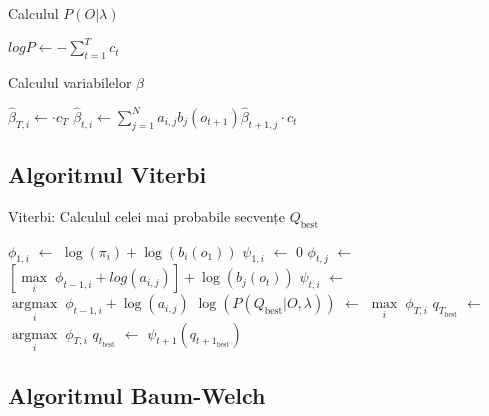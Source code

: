 \documentclass[12pt]{article}
\begin{document}
\begin{algorithm}[H]
  \caption{Calculul $P(O \vert \lambda)$}
  \label{alg2:logP}
  \begin{algorithmic}[2]
    \STATE $logP \leftarrow -\displaystyle\sum_{t=1}^{T}c_t$
  \end{algorithmic}
\end{algorithm}

\begin{algorithm}[H]
  \caption{Calculul variabilelor $\beta$}
  \label{alg3:beta}
  \begin{algorithmic}[2]
     \STATE $\hat{\beta}_{T,i} \leftarrow \cdot
    c_T$
    \ENDFOR
      \STATE
    $\hat{\beta}_{t,i} \leftarrow \displaystyle\sum_{j=1}^{N}
    a_{i,j} b_{j}(o_{t+1}) \hat{\beta}_{t+1,j} \cdot c_t$
    \ENDFOR
    \ENDFOR
  \end{algorithmic}
\end{algorithm}


\subsection{Algoritmul Viterbi}
\label{sec:viterbi}

\begin{algorithm}[H]
  \caption{Viterbi: Calculul celei mai probabile secvențe $Q_{\text{best}}$}
  \label{alg:viterbi}
  \begin{algorithmic}[2]
    \STATE $\phi_{1,i}$ $\leftarrow$ $\log(\pi_{i}) + \log(b_i(o_1))$
    \STATE $\psi_{1,i}$ $\leftarrow$ $0$
    \ENDFOR
    \STATE $\phi_{t,j}$ $\leftarrow$ $[\underset{i}{\operatorname{max}}\; \phi_{t-1,i} +
    log(a_{i,j})] + \log(b_{j}(o_{t}))$
    \STATE $\psi_{t,i}$ $\leftarrow$ $\underset{i}{\operatorname{argmax}}\; \phi_{t-1,i} +
    \log(a_{i,j})$
    \ENDFOR
    \ENDFOR
    \STATE $\log(P(Q_{\text{best}} \vert O, \lambda))$ $\leftarrow$ $\underset{i}{\operatorname{max}}\; \phi_{T,i}$
    \STATE $q_{T_{\text{best}}}$ $\leftarrow$ $\underset{i}{\operatorname{argmax}}\; \phi_{T,i}$
    \STATE $q_{t_{\text{best}}}$ $\leftarrow$ $\psi_{t+1}(q_{t+1_{\text{best}}})$
    \ENDFOR
  \end{algorithmic} 
\end{algorithm}
 
  
\subsection{Algoritmul Baum-Welch}
\label{sec:baum-welch}
\end{document}
